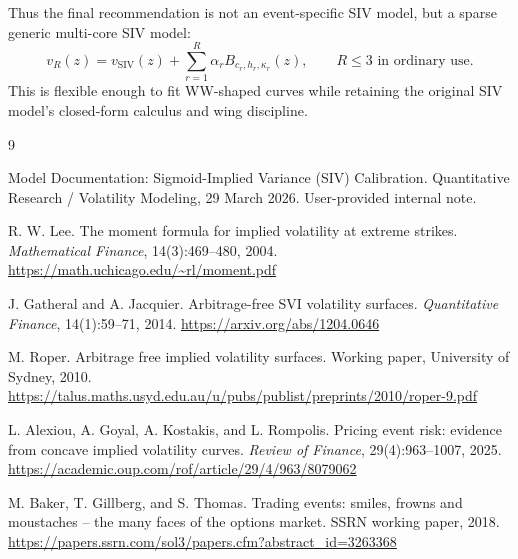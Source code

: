 \documentclass[11pt]{article}
\begin{document}
Thus the final recommendation is not an event-specific SIV model, but a sparse generic multi-core SIV model:
\begin{equation}
  \boxed{
  v_R(z)=v_{\mathrm{SIV}}(z)+\sum_{r=1}^{R}\alpha_r B_{c_r,h_r,\kappa_r}(z),
  \qquad R\le3\text{ in ordinary use.}
  }
\end{equation}
This is flexible enough to fit WW-shaped curves while retaining the original SIV model's closed-form calculus and wing discipline.

\begin{thebibliography}{9}

Model Documentation: Sigmoid-Implied Variance (SIV) Calibration.
Quantitative Research / Volatility Modeling, 29 March 2026.
User-provided internal note.

R. W. Lee.
\newblock The moment formula for implied volatility at extreme strikes.
\newblock \emph{Mathematical Finance}, 14(3):469--480, 2004.
\newblock \url{https://math.uchicago.edu/~rl/moment.pdf}

J. Gatheral and A. Jacquier.
\newblock Arbitrage-free SVI volatility surfaces.
\newblock \emph{Quantitative Finance}, 14(1):59--71, 2014.
\newblock \url{https://arxiv.org/abs/1204.0646}

M. Roper.
\newblock Arbitrage free implied volatility surfaces.
\newblock Working paper, University of Sydney, 2010.
\newblock \url{https://talus.maths.usyd.edu.au/u/pubs/publist/preprints/2010/roper-9.pdf}

L. Alexiou, A. Goyal, A. Kostakis, and L. Rompolis.
\newblock Pricing event risk: evidence from concave implied volatility curves.
\newblock \emph{Review of Finance}, 29(4):963--1007, 2025.
\newblock \url{https://academic.oup.com/rof/article/29/4/963/8079062}

M. Baker, T. Gillberg, and S. Thomas.
\newblock Trading events: smiles, frowns and moustaches -- the many faces of the options market.
\newblock SSRN working paper, 2018.
\newblock \url{https://papers.ssrn.com/sol3/papers.cfm?abstract_id=3263368}

\end{thebibliography}
\end{document}

